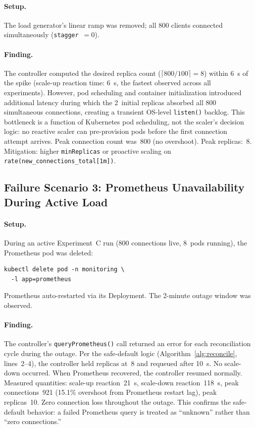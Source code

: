 \documentclass[twocolumn]{svjour3}
\begin{document}
\paragraph{Setup.} The load generator's linear ramp was removed; all 800 clients connected
simultaneously (\texttt{stagger}~$= 0$).

\paragraph{Finding.} The controller computed the desired replica count
($\lceil800/100\rceil = 8$) within 6~s of the spike (scale-up reaction time: 6~s, the fastest
observed across all experiments). However, pod scheduling and container initialization
introduced additional latency during which the 2~initial replicas absorbed all 800 simultaneous
connections, creating a transient OS-level \texttt{listen()} backlog. This bottleneck is a
function of Kubernetes pod scheduling, not the scaler's decision logic: no reactive scaler can
pre-provision pods before the first connection attempt arrives. Peak connection count was~800
(no overshoot). Peak replicas:~8. Mitigation: higher \texttt{minReplicas} or proactive scaling on
\texttt{rate(new\_connections\_total[1m])}.

\subsection{Failure Scenario 3: Prometheus Unavailability During Active Load}

\paragraph{Setup.} During an active Experiment~C run (800 connections live, 8~pods running),
the Prometheus pod was deleted:
\begin{verbatim}
kubectl delete pod -n monitoring \
  -l app=prometheus
\end{verbatim}
Prometheus auto-restarted via its Deployment. The 2-minute outage window was observed.

\paragraph{Finding.} The controller's \texttt{queryPrometheus()} call returned an error for
each reconciliation cycle during the outage. Per the safe-default logic
(Algorithm~\ref{alg:reconcile}, lines~2--4), the controller held replicas at~8 and requeued
after 10~s. No scale-down occurred. When Prometheus recovered, the controller resumed
normally. Measured quantities: scale-up reaction~21~s, scale-down reaction~118~s, peak
connections~921 (15.1\% overshoot from Prometheus restart lag), peak replicas~10. Zero
connection loss throughout the outage. This confirms the safe-default behavior: a failed
Prometheus query is treated as ``unknown'' rather than ``zero connections.''
\end{document}
